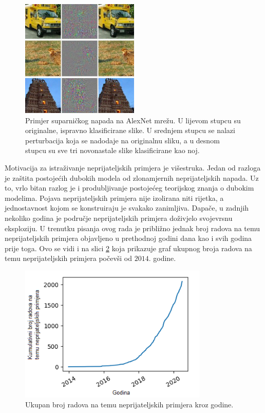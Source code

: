 \documentclass[utf8, diplomski]{fer}
\begin{document}
\begin{figure}[H]
\centering
\includegraphics[width=0.5\textwidth,keepaspectratio]{img/other/alexnet_adv.jpg}
\caption{Primjer suparničkog napada na AlexNet mrežu\citep{Szegedy2014IntriguingPO}. U lijevom stupcu su originalne, ispravno klasificirane slike. U srednjem stupcu se nalazi perturbacija koja se nadodaje na originalnu sliku, a u desnom stupcu su sve tri novonastale slike klasificirane kao noj.}
\label{fig:alexnet_adv}
\end{figure}

\par
Motivacija za istraživanje neprijateljskih primjera je višestruka. Jedan od razloga je zaštita postojećih dubokih modela od zlonamjernih neprijateljskih napada. Uz to, vrlo bitan razlog je i produbljivanje postojećeg teorijskog znanja o dubokim modelima. Pojava neprijateljskih primjera nije izolirana niti rijetka, a jednostavnost kojom se konstruiraju je svakako zanimljiva. Dapače, u zadnjih nekoliko godina je područje neprijateljskih primjera doživjelo svojevrsnu eksploziju. U trenutku pisanja ovog rada je približno jednak broj radova na temu neprijateljskih primjera objavljeno u prethodnoj godini dana kao i svih godina prije toga. Ovo se vidi i na slici \ref{fig:cumsum_adv} koja prikazuje graf ukupnog broja radova na temu neprijateljskih primjera počevši od $2014.$ godine.

\begin{figure}[H]
\centering
\includegraphics[width=0.8\textwidth,keepaspectratio]{img/other/cumsum.png}
\caption{Ukupan broj radova na temu neprijateljskih primjera kroz godine.\citep{carlini_webpage}}
\label{fig:cumsum_adv}
\end{figure}
\end{document}
